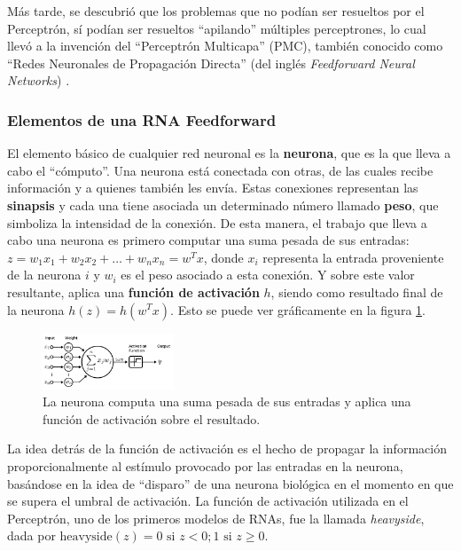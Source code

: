 \documentclass[../../main.tex]{subfiles}
\begin{document}
Más tarde, se descubrió que los problemas que no podían ser resueltos por el Perceptrón, sí podían ser resueltos ``apilando'' múltiples perceptrones, lo cual llevó a la invención del ``Perceptrón Multicapa'' (PMC), también conocido como ``Redes Neuronales de Propagación Directa'' (del inglés \textit{Feedforward Neural Networks}) \cite{deep-learning}. 

\subsubsection{Elementos de una RNA Feedforward}


El elemento básico de cualquier red neuronal es la \textbf{neurona}, que es la que lleva a cabo el ``cómputo''. Una neurona está conectada con otras, de las cuales recibe información y a quienes también les envía. Estas conexiones representan las \textbf{sinapsis} y cada una tiene asociada un determinado número llamado \textbf{peso}, que simboliza la intensidad de la conexión. De esta manera, el trabajo que lleva a cabo una neurona es primero computar una suma pesada de sus entradas: \(z = w_1x_1 + w_2x_2 + … + w_nx_n = w^T x\), donde \(x_i\) representa la entrada proveniente de la neurona \(i\) y \(w_i\) es el peso asociado a esta conexión. Y sobre este valor resultante, aplica una \textbf{función de activación} \(h\), siendo como resultado final de la neurona \(h(z) = h(w^T x)\). Esto se puede ver gráficamente en la figura \ref{fig:neuron}.

\begin{figure}[h!]
    \centering
    \includegraphics[width=0.35\textwidth]{figs/neuron.png}
    \caption{La neurona computa una suma pesada de sus entradas y aplica una función de activación sobre el resultado.}
    \label{fig:neuron}
\end{figure}

La idea detrás de la función de activación es el hecho de propagar la información proporcionalmente al estímulo provocado por las entradas en la neurona, basándose en la idea de ``disparo'' de una neurona biológica en el momento en que se supera el umbral de activación. La función de activación utilizada en el Perceptrón, uno de los primeros modelos de RNAs, fue la llamada \textit{heavyside}, dada por \(\text{heavyside}(z)=0\text{ si }z < 0; 1\text{ si } z\geq0\). 
\end{document}
